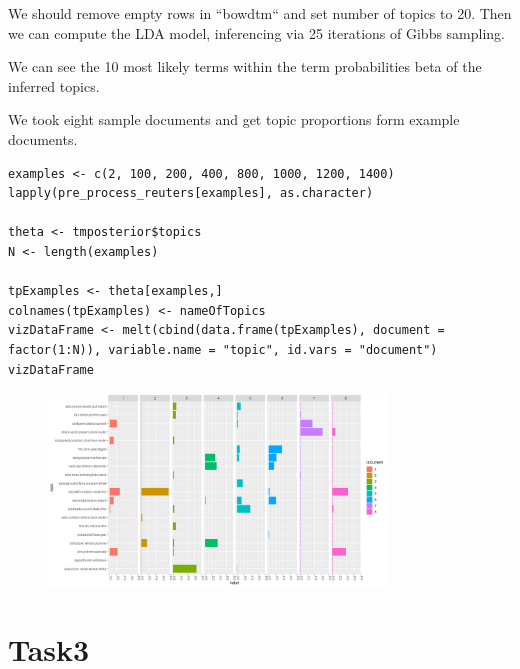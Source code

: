 \documentclass{article}
\begin{document}
We should remove empty rows in ``bowdtm`` and set number of topics to 20. Then we can compute the LDA model, inferencing via 25 iterations of Gibbs sampling.

We can see the 10 most likely terms within the term probabilities beta of the inferred topics.

We took eight sample documents and get topic proportions form example documents.

\begin{lstlisting}
examples <- c(2, 100, 200, 400, 800, 1000, 1200, 1400)
lapply(pre_process_reuters[examples], as.character)

theta <- tmposterior$topics
N <- length(examples)

tpExamples <- theta[examples,]
colnames(tpExamples) <- nameOfTopics
vizDataFrame <- melt(cbind(data.frame(tpExamples), document = factor(1:N)), variable.name = "topic", id.vars = "document")  
vizDataFrame
\end{lstlisting}

\begin{figure}[H]
  \centering
  \includegraphics[width=0.8\textwidth]{task2.2.png}
\end{figure}


\section{Task3}
\end{document}

